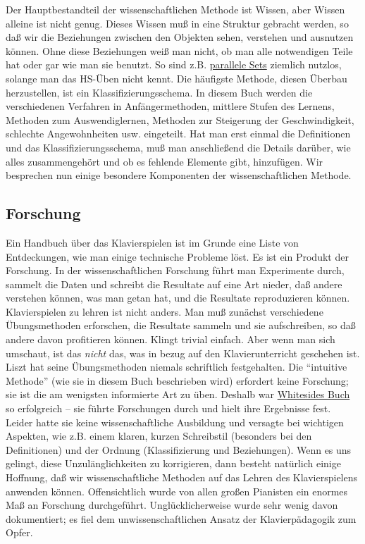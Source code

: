 Der Hauptbestandteil der wissenschaftlichen Methode ist Wissen, aber Wissen alleine ist nicht genug.
Dieses Wissen muß in eine Struktur gebracht werden, so daß wir die Beziehungen zwischen den Objekten sehen, verstehen und ausnutzen können.
Ohne diese Beziehungen weiß man nicht, ob man alle notwendigen Teile hat oder gar wie man sie benutzt.
So sind z.B. \hyperref[c1ii11]{parallele Sets} ziemlich nutzlos, solange man das HS-Üben nicht kennt.
Die häufigste Methode, diesen Überbau herzustellen, ist ein Klassifizierungsschema.
In diesem Buch werden die verschiedenen Verfahren in Anfängermethoden, mittlere Stufen des Lernens, Methoden zum Auswendiglernen, Methoden zur Steigerung der Geschwindigkeit, schlechte Angewohnheiten usw. eingeteilt.
Hat man erst einmal die Definitionen und das Klassifizierungsschema, muß man anschließend die Details darüber, wie alles zusammengehört und ob es fehlende Elemente gibt, hinzufügen.
Wir besprechen nun einige besondere Komponenten der wissenschaftlichen Methode.


\subsection{Forschung}
\label{c3_3c}

Ein Handbuch über das Klavierspielen ist im Grunde eine Liste von Entdeckungen, wie man einige technische Probleme löst.
Es ist ein Produkt der Forschung.
In der wissenschaftlichen Forschung führt man Experimente durch, sammelt die Daten und schreibt die Resultate auf eine Art nieder, daß andere verstehen können, was man getan hat, und die Resultate reproduzieren können.
Klavierspielen zu lehren ist nicht anders.
Man muß zunächst verschiedene Übungsmethoden erforschen, die Resultate sammeln und sie aufschreiben, so daß andere davon profitieren können.
Klingt trivial einfach.
Aber wenn man sich umschaut, ist das \textit{nicht} das, was in bezug auf den Klavierunterricht geschehen ist.
Liszt hat seine Übungsmethoden niemals schriftlich festgehalten.
Die \enquote{intuitive Methode} (wie sie in diesem Buch beschrieben wird) erfordert keine Forschung; sie ist die am wenigsten informierte Art zu üben.
Deshalb war \hyperref[Whiteside]{Whitesides Buch} so erfolgreich -- sie führte Forschungen durch und hielt ihre Ergebnisse fest.
Leider hatte sie keine wissenschaftliche Ausbildung und versagte bei wichtigen Aspekten, wie z.B. einem klaren, kurzen Schreibstil (besonders bei den Definitionen) und der Ordnung (Klassifizierung und Beziehungen).
Wenn es uns gelingt, diese Unzulänglichkeiten zu korrigieren, dann besteht natürlich einige Hoffnung, daß wir wissenschaftliche Methoden auf das Lehren des Klavierspielens anwenden können.
Offensichtlich wurde von allen großen Pianisten ein enormes Maß an Forschung durchgeführt.
Unglücklicherweise wurde sehr wenig davon dokumentiert; es fiel dem unwissenschaftlichen Ansatz der Klavierpädagogik zum Opfer.


